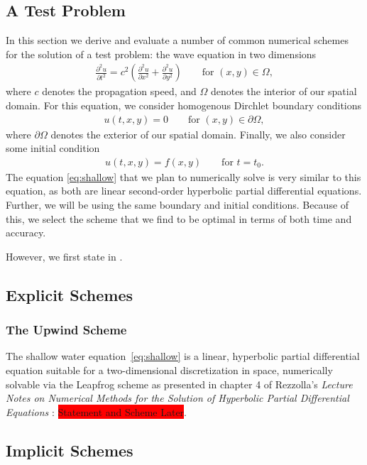 \documentclass[../main.tex]{subfiles}
\begin{document}
\subsection{A Test Problem}
In this section we derive and evaluate a number of common numerical schemes for the solution of a test problem: the wave equation in two dimensions
\begin{gather}\label{eq:wave}
    \frac{\partial^2 u}{\partial t^2} = c^2\left(\frac{\partial^2 u}{\partial x^2} + \frac{\partial^2 u}{\partial y^2} \right)\qquad\text{for }(x,y)\in\Omega,
\end{gather}
where $c$ denotes the propagation speed, and $\Omega$ denotes the interior of our spatial domain. For this equation, we consider homogenous Dirchlet boundary conditions
\begin{gather}\label{eq:bcs}
    u(t,x,y) = 0\qquad\text{for }(x,y)\in\partial\Omega,
\end{gather}
where $\partial\Omega$ denotes the exterior of our spatial domain. Finally, we also consider some initial condition
\begin{gather}\label{eq:ic}
    u(t,x,y) = f(x,y)\qquad\text{for }t=t_0.
\end{gather}
The equation \ref{eq:shallow}  that we plan to numerically solve is very similar to this equation, as both are linear second-order hyperbolic partial differential equations. Further, we will be using the same boundary and initial conditions. Because of this, we select the scheme that we find to be optimal in terms of both time and accuracy.

\noindent However, we first state \label{eq:wave} in .

\subsection{Explicit Schemes}
\subsubsection{The Upwind Scheme}


The shallow water equation~\ref{eq:shallow} is a linear, hyperbolic partial differential equation suitable for a two-dimensional discretization in space, numerically solvable via the Leapfrog scheme as presented in chapter 4 of Rezzolla's \textit{Lecture Notes on Numerical Methods for the Solution of Hyperbolic Partial Differential Equations} \cite{rezzolla}: \colorbox{red}{Statement and Scheme Later}.
\subsection{Implicit Schemes}
\end{document}
